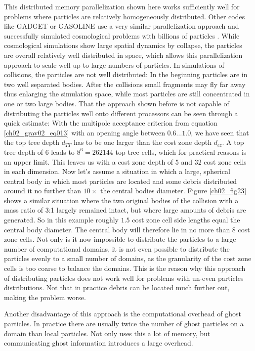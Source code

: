 This distributed memory parallelization shown here works sufficiently well for problems where particles are  relatively homogeneously distributed. Other codes like GADGET or GASOLINE use a very similar parallelization approach and successfully simulated cosmological problems with billions of particles \cite{2005Natur.435..629S}. While cosmological simulations show large spatial dynamics by collapse, the particles are overall relatively well distributed in space, which allows this parallelization approach to scale well up to large numbers of particles. In simulations of collisions, the particles are not well distributed: In the beginning particles are in two well separated bodies. After the collisions small fragments may fly far away thus enlarging the simulation space, while most particles are still concentrated in one or two large bodies. That the approach shown before is not capable of distributing the particles well onto different processors can be seen through a quick estimate: With the multipole acceptance criterion from equation \ref{ch02_grav02_eq013} with an opening angle between $0.6 \dots 1.0 $, we have seen that the top tree depth $d_{TT}$ has to be one larger than the cost zone depth $d_{cz}$. A top tree depth of 6 leads to $8^6 = 262144$ top tree cells, which for practical reasons is an upper limit.  This leaves us with a cost zone depth of 5 and 32 cost zone cells in each dimension. Now let's assume a situation in which a large, spherical central body in which most particles are located and some debris distributed around it no further than $10 \times$ the central bodies diameter. Figure \ref{ch02_fig23} shows a similar situation where the two original bodies of the collision with a mass ratio of 3:1 largely remained intact, but where large amounts of debris are generated. So in this example roughly $1.5$ cost zone cell side lengths equal the central body diameter. The central body will therefore lie in no more than 8 cost zone cells. Not only is it now impossible to distribute the particles to a large number of computational domains, it is not even possible to distribute the particles evenly to a small number of domains, as the granularity of the cost zone cells is too coarse to balance the domains. This is the reason why this approach of distributing particles does not work well for problems with un-even particles distributions. Not that in practice debris can be located much further out, making the problem worse.

Another disadvantage of this approach is the computational overhead of ghost particles. In practice there are usually twice the number of ghost particles on a domain than local particles. Not only uses this a lot of memory, but communicating ghost information introduces a large overhead. 

